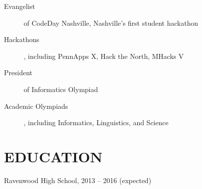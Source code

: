 \documentclass{res}
\begin{document}
\begin{description}
  \item[Evangelist] of CodeDay Nashville, Nashville's first student hackathon
  \item[Hackathons], including PennApps X, Hack the North, MHacks V
  \item[President] of Informatics Olympiad
  \item[Academic Olympiads], including Informatics, Linguistics, and Science
\end{description}

\section{EDUCATION}

Ravenwood High School, 2013 -- 2016 {(expected)}
\end{document}
